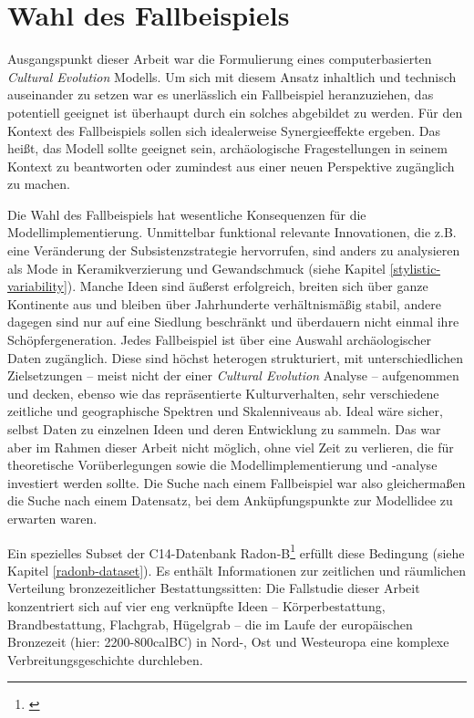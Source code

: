 \documentclass[openany,twoside,twocolumn]{book}
\let\rmarkdownfootnote\footnote%
\def\footnote{\protect\rmarkdownfootnote}
\begin{document}
\hypertarget{case-study}{%
\section{Wahl des Fallbeispiels}\label{case-study}}

Ausgangspunkt dieser Arbeit war die Formulierung eines computerbasierten
\emph{Cultural Evolution} Modells. Um sich mit diesem Ansatz inhaltlich
und technisch auseinander zu setzen war es unerlässlich ein Fallbeispiel
heranzuziehen, das potentiell geeignet ist überhaupt durch ein solches
abgebildet zu werden. Für den Kontext des Fallbeispiels sollen sich
idealerweise Synergieeffekte ergeben. Das heißt, das Modell sollte
geeignet sein, archäologische Fragestellungen in seinem Kontext zu
beantworten oder zumindest aus einer neuen Perspektive zugänglich zu
machen.

Die Wahl des Fallbeispiels hat wesentliche Konsequenzen für die
Modellimplementierung. Unmittelbar funktional relevante Innovationen,
die z.B. eine Veränderung der Subsistenzstrategie hervorrufen, sind
anders zu analysieren als Mode in Keramikverzierung und Gewandschmuck
(siehe Kapitel \ref{stylistic-variability}). Manche Ideen sind äußerst
erfolgreich, breiten sich über ganze Kontinente aus und bleiben über
Jahrhunderte verhältnismäßig stabil, andere dagegen sind nur auf eine
Siedlung beschränkt und überdauern nicht einmal ihre Schöpfergeneration.
Jedes Fallbeispiel ist über eine Auswahl archäologischer Daten
zugänglich. Diese sind höchst heterogen strukturiert, mit
unterschiedlichen Zielsetzungen -- meist nicht der einer \emph{Cultural
Evolution} Analyse -- aufgenommen und decken, ebenso wie das
repräsentierte Kulturverhalten, sehr verschiedene zeitliche und
geographische Spektren und Skalenniveaus ab. Ideal wäre sicher, selbst
Daten zu einzelnen Ideen und deren Entwicklung zu sammeln. Das war aber
im Rahmen dieser Arbeit nicht möglich, ohne viel Zeit zu verlieren, die
für theoretische Vorüberlegungen sowie die Modellimplementierung und
-analyse investiert werden sollte. Die Suche nach einem Fallbeispiel war
also gleichermaßen die Suche nach einem Datensatz, bei dem
Anküpfungspunkte zur Modellidee zu erwarten waren.

Ein spezielles Subset der C14-Datenbank Radon-B\footnote{\textcite{kneisel_radon-b_2013}}
erfüllt diese Bedingung (siehe Kapitel \ref{radonb-dataset}). Es enthält
Informationen zur zeitlichen und räumlichen Verteilung bronzezeitlicher
Bestattungssitten: Die Fallstudie dieser Arbeit konzentriert sich auf
vier eng verknüpfte Ideen -- Körperbestattung, Brandbestattung,
Flachgrab, Hügelgrab -- die im Laufe der europäischen Bronzezeit (hier:
2200-800calBC) in Nord-, Ost und Westeuropa eine komplexe
Verbreitungsgeschichte durchleben.
\end{document}

